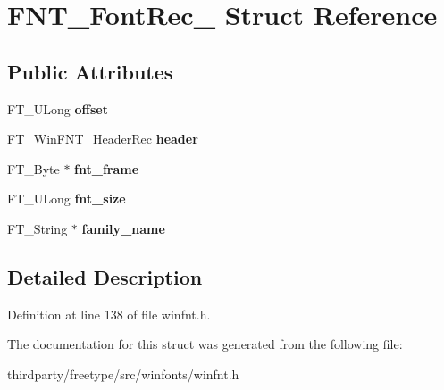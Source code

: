 \hypertarget{struct_f_n_t___font_rec__}{}\section{F\+N\+T\+\_\+\+Font\+Rec\+\_\+ Struct Reference}
\label{struct_f_n_t___font_rec__}
\subsection*{Public Attributes}
\begin{DoxyCompactItemize}
\item 
\mbox{\label{struct_f_n_t___font_rec___a3b31b101f35ed05e36c0437f5914aae1}} 
F\+T\+\_\+\+U\+Long {\bfseries offset}
\item 
\mbox{\label{struct_f_n_t___font_rec___a076defc551b80ac0ff29293e5ab1dc8f}} 
\hyperlink{struct_f_t___win_f_n_t___header_rec__}{F\+T\+\_\+\+Win\+F\+N\+T\+\_\+\+Header\+Rec} {\bfseries header}
\item 
\mbox{\label{struct_f_n_t___font_rec___a527defd5af4e48d8e8c6a5cedfd90367}} 
F\+T\+\_\+\+Byte $\ast$ {\bfseries fnt\+\_\+frame}
\item 
\mbox{\label{struct_f_n_t___font_rec___a8266ca89039c7441c371e5dcaf8238eb}} 
F\+T\+\_\+\+U\+Long {\bfseries fnt\+\_\+size}
\item 
\mbox{\label{struct_f_n_t___font_rec___afd7f3743ff327c0e9a9990086bbc3541}} 
F\+T\+\_\+\+String $\ast$ {\bfseries family\+\_\+name}
\end{DoxyCompactItemize}


\subsection{Detailed Description}


Definition at line 138 of file winfnt.\+h.



The documentation for this struct was generated from the following file\+:\begin{DoxyCompactItemize}
\item 
thirdparty/freetype/src/winfonts/winfnt.\+h\end{DoxyCompactItemize}
